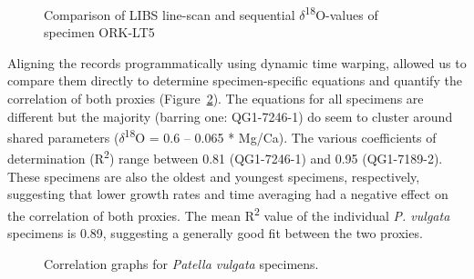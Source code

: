 \documentclass[
  authoryear,
  preprint,
  3p]{elsarticle}
\begin{document}
\begin{figure}


\caption{\label{fig-Pat_Comp}Comparison of LIBS line-scan and sequential
\(\delta\)\textsuperscript{18}O-values of specimen ORK-LT5}

\end{figure}%

Aligning the records programmatically using dynamic time warping,
allowed us to compare them directly to determine specimen-specific
equations and quantify the correlation of both proxies
(Figure~\ref{fig-Pat_Corr}). The equations for all specimens are
different but the majority (barring one: QG1-7246-1) do seem to cluster
around shared parameters (\(\delta\)\textsuperscript{18}Ο = 0.6 -- 0.065
* Mg/Ca). The various coefficients of determination
(R\textsuperscript{2}) range between 0.81 (QG1-7246-1) and 0.95
(QG1-7189-2). These specimens are also the oldest and youngest
specimens, respectively, suggesting that lower growth rates and time
averaging had a negative effect on the correlation of both proxies. The
mean R\textsuperscript{2} value of the individual \emph{P. vulgata}
specimens is 0.89, suggesting a generally good fit between the two
proxies.

\begin{figure}


\caption{\label{fig-Pat_Corr}Correlation graphs for \emph{Patella
vulgata} specimens.}

\end{figure}%
\end{document}
